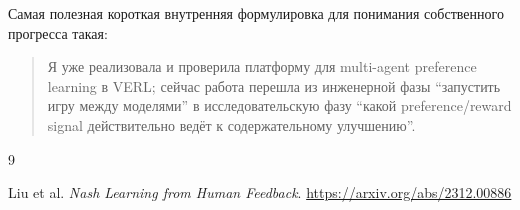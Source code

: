 \documentclass[11pt,a4paper]{article}
\begin{document}
Самая полезная короткая внутренняя формулировка для понимания собственного прогресса такая:

\begin{quote}
Я уже реализовала и проверила платформу для multi-agent preference learning в VERL; сейчас работа перешла из инженерной фазы ``запустить игру между моделями'' в исследовательскую фазу ``какой preference/reward signal действительно ведёт к содержательному улучшению''.
\end{quote}

\begin{thebibliography}{9}

Liu et al.
\newblock \textit{Nash Learning from Human Feedback}.
\newblock \url{https://arxiv.org/abs/2312.00886}

\end{thebibliography}
\end{document}
